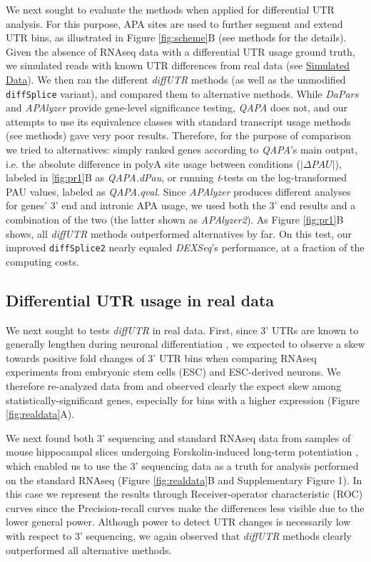 \documentclass{bmcart}
\begin{document}
We next sought to evaluate the methods when applied for differential UTR analysis. For this purpose, APA sites are used to further segment and extend UTR bins, as illustrated in Figure \ref{fig:scheme}B (see methods for the details). Given the absence of RNAseq data with a differential UTR usage ground truth, we simulated reads with known UTR differences from real data (see \hyperref[sec:sim]{Simulated Data}). We then ran the different \textit{diffUTR} methods (as well as the unmodified \texttt{diffSplice} variant), and compared them to alternative methods. While \textit{DaPars} \cite{Xia2014DynamicTypes} and \textit{APAlyzer} provide gene-level significance testing, \textit{QAPA} \cite{Ha2018QAPA:Data} does not, and our attempts to use its equivalence classes with standard transcript usage methods (see methods) gave very poor results. Therefore, for the purpose of comparison we tried to alternatives: simply ranked genes according to \textit{QAPA}'s main output, i.e. the absolute difference in polyA site usage between conditions ($|\Delta PAU|$), labeled in \ref{fig:pr1}B as \textit{QAPA.dPau}, or running \textit{t}-tests on the log-transformed PAU values, labeled as \textit{QAPA.qval}. Since \textit{APAlyzer} produces different analyses for genes' 3' end and intronic APA usage, we used both the 3' end results and a combination of the two (the latter shown as \textit{APAlyzer2}). As Figure \ref{fig:pr1}B shows, all \textit{diffUTR} methods outperformed alternatives by far. On this test, our improved \texttt{diffSplice2} nearly equaled \textit{DEXSeq}'s performance, at a fraction of the computing costs.

\subsection*{Differential UTR usage in real data}

We next sought to tests \textit{diffUTR} in real data. First, since 3' UTRs are known to generally lengthen during neuronal differentiation \cite{Blair2017WidespreadDifferentiation,Ha2018QAPA:Data}, we expected to observe a skew towards positive fold changes of 3' UTR bins when comparing RNAseq experiments from embryonic stem cells (ESC) and ESC-derived neurons. We therefore re-analyzed data from \cite{WhippleImprinted2020} and observed clearly the expect skew among statistically-significant genes, especially for bins with a higher expression (Figure \ref{fig:realdata}A).

We next found both 3' sequencing and standard RNAseq data from samples of mouse hippocampal slices undergoing Forskolin-induced long-term potentiation \cite{Fontes2017Activity-DependentPotentiation}, which enabled us to use the 3' sequencing data as a truth for analysis performed on the standard RNAseq (Figure \ref{fig:realdata}B and Supplementary Figure 1). In this case we represent the results through Receiver-operator characteristic (ROC) curves since the Precision-recall curves make the differences less visible due to the lower general power. Although power to detect UTR changes is necessarily low with respect to 3' sequencing, we again observed that \textit{diffUTR} methods clearly outperformed all alternative methods.
\end{document}
